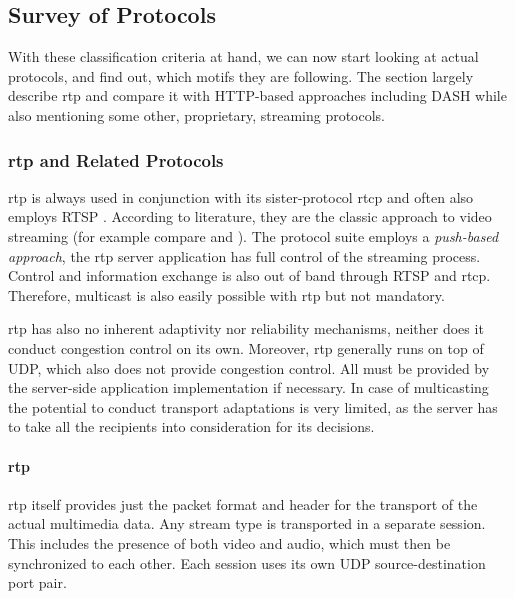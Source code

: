 \subsection{Survey of Protocols}

With these classification criteria at hand, we can now start looking at actual protocols, and find out, which motifs they are following. The section largely describe \gls{rtp} and compare it with \gls{HTTP}-based approaches including \gls{DASH} while also mentioning some other, proprietary, streaming protocols.


\subsubsection{\texorpdfstring{\acrshort{rtp}}{rtp} and Related Protocols}

\gls{rtp} \cite{rfc3550} is always used in conjunction with its sister-protocol \gls{rtcp} and often also employs \gls{RTSP} \cite{rfc2326}. According to literature, they are the classic approach to video streaming (for example compare \cite[p.~589ff]{kurose2008computer} and \cite[p.~426ff]{peterson2007computer}).
The protocol suite employs a \textit{push-based approach}, the \gls{rtp} server application has full control of the streaming process. Control and information exchange is also out of band through \gls{RTSP} and \gls{rtcp}. Therefore, multicast is also easily possible with \gls{rtp} but not mandatory.

\gls{rtp} has also no inherent adaptivity nor reliability mechanisms, neither does it conduct congestion control on its own. Moreover, \gls{rtp} generally runs on top of \gls{UDP}, which also does not provide congestion control. All must be provided by the server-side application implementation if necessary. In case of multicasting the potential to conduct transport adaptations is very limited, as the server has to take all the recipients into consideration for its decisions.


\paragraph{\gls{rtp}}

\gls{rtp} itself provides just the packet format and header for the transport of the actual multimedia data. Any stream type is transported in a separate session. This includes the presence of both video and audio, which must then be synchronized to each other. Each session uses its own \gls{UDP} source-destination port pair.

